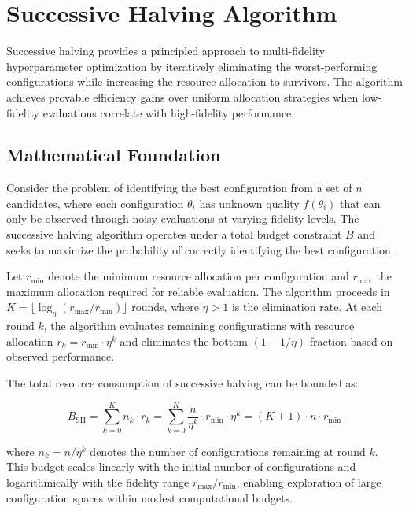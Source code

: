 \section{Successive Halving Algorithm}
\label{sec:successive_halving}

Successive halving provides a principled approach to multi-fidelity hyperparameter optimization by iteratively eliminating the worst-performing configurations while increasing the resource allocation to survivors. The algorithm achieves provable efficiency gains over uniform allocation strategies when low-fidelity evaluations correlate with high-fidelity performance.

\subsection{Mathematical Foundation}

Consider the problem of identifying the best configuration from a set of $n$ candidates, where each configuration $\theta_i$ has unknown quality $f(\theta_i)$ that can only be observed through noisy evaluations at varying fidelity levels. The successive halving algorithm operates under a total budget constraint $B$ and seeks to maximize the probability of correctly identifying the best configuration.

Let $r_{\min}$ denote the minimum resource allocation per configuration and $r_{\max}$ the maximum allocation required for reliable evaluation. The algorithm proceeds in $K = \lfloor \log_\eta(r_{\max}/r_{\min}) \rfloor$ rounds, where $\eta > 1$ is the elimination rate. At each round $k$, the algorithm evaluates remaining configurations with resource allocation $r_k = r_{\min} \cdot \eta^k$ and eliminates the bottom $(1 - 1/\eta)$ fraction based on observed performance.

The total resource consumption of successive halving can be bounded as:

\begin{equation}
B_{\text{SH}} = \sum_{k=0}^{K} n_k \cdot r_k = \sum_{k=0}^{K} \frac{n}{\eta^k} \cdot r_{\min} \cdot \eta^k = (K+1) \cdot n \cdot r_{\min}
\label{eq:sh_budget}
\end{equation}

where $n_k = n/\eta^k$ denotes the number of configurations remaining at round $k$. This budget scales linearly with the initial number of configurations and logarithmically with the fidelity range $r_{\max}/r_{\min}$, enabling exploration of large configuration spaces within modest computational budgets.

